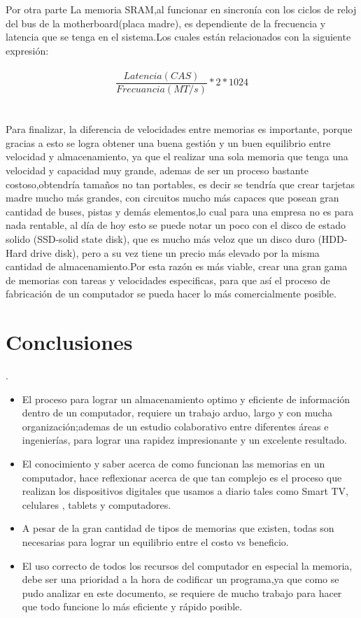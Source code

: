 \documentclass{article}
\begin{document}
Por otra parte La memoria SRAM,al funcionar en sincronía con los ciclos de reloj del bus de la motherboard(placa madre), es dependiente de la frecuencia y latencia que se tenga en el sistema.Los cuales están relacionados con la siguiente expresión:\\\\

\begin{equation}
\frac{Latencia(CAS)}{Frecuancia(MT/s)}*2*1024 
\label{eq}
\end{equation}
\\\\
Para finalizar, la diferencia de velocidades entre memorias es importante, porque gracias a esto se logra obtener una buena gestión y un buen equilibrio entre velocidad y almacenamiento, ya que el realizar una sola memoria que tenga una velocidad y capacidad muy grande, ademas de ser un proceso bastante costoso,obtendría tamaños no tan portables, es decir se tendría que crear tarjetas madre mucho más grandes, con circuitos mucho más capaces que posean gran cantidad de buses, pistas y demás elementos,lo cual para una empresa no es para nada rentable, al día de hoy esto se puede notar un poco con el disco de estado solido (SSD-solid state disk), que es mucho más veloz que un disco duro (HDD-Hard drive disk), pero a su vez tiene un precio más elevado por la misma cantidad de almacenamiento.Por esta razón es más viable, crear una gran gama de memorias con tareas y velocidades especificas, para que así el proceso de fabricación de un computador se pueda hacer lo más comercialmente posible.


\section{Conclusiones}.\label{conclusiones}
\begin{itemize}
    \item El proceso para lograr un almacenamiento optimo y eficiente de información dentro de un computador, requiere un trabajo arduo, largo y con mucha organización;ademas de un estudio colaborativo entre diferentes áreas e ingenierías, para lograr una rapidez impresionante y un excelente resultado.
    \item El conocimiento y saber acerca de como funcionan las memorias en un computador, hace reflexionar acerca de que tan complejo es el proceso que realizan los dispositivos digitales que usamos a diario tales como Smart TV, celulares , tablets y computadores.
    \item A pesar de la gran cantidad de tipos de memorias que existen, todas son necesarias para lograr un equilibrio entre el costo vs beneficio.
    \item El uso correcto de todos los recursos del computador en especial la memoria, debe ser una prioridad a la hora de codificar un programa,ya que como se pudo analizar en este documento, se requiere de mucho trabajo para hacer que todo funcione lo más eficiente y rápido posible.
\end{itemize}

\newpage


\noindent

\end{document}
